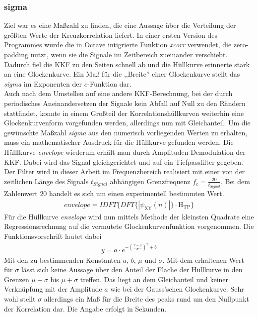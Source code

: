 \subsubsection{sigma}
Ziel war es eine Maßzahl zu finden, die eine Aussage über die Verteilung der größten Werte der Kreuzkorrelation liefert. In einer ersten Version des Programmes wurde die in Octave intigrierte Funktion \textit{xcorr} verwendet, die zero-padding nutzt, wenn sie die Signale im Zeitbereich zueinander verschiebt. Dadurch fiel die KKF zu den Seiten schnell ab und die Hüllkurve erinnerte stark an eine Glockenkurve. Ein Maß für die ,,Breite'' einer Glockenkurve stellt das \textit{sigma} im Exponenten der $e$-Funktion dar. 
\\Auch nach dem Umstellen auf eine andere KKF-Berechnung, bei der durch periodisches Aneinandersetzen der Signale kein Abfall auf Null zu den Rändern stattfindet, konnte in einem Großteil der Korrelationshüllkurven weiterhin eine Glockenkurvenform vorgefunden werden, allerdings nun mit Gleichanteil. Um die gewünschte Maßzahl \textit{sigma} aus den numerisch vorliegenden Werten zu erhalten, muss ein mathematischer Ausdruck für die Hüllkurve gefunden werden. Die Hülllkurve \textit{envelope} wiederum erhält man durch Amplituden-Demodulation der KKF. Dabei wird das Signal gleichgerichtet und auf ein Tiefpassfilter gegeben. Der Filter wird in dieser Arbeit im Frequenzbereich realisiert mit einer von der zeitlichen Länge des Signals $t_{Signal}$ abhängigen Grenzfrequenz $f_{c} = \frac{20}{t_{Signal}}$. Bei dem Zahlenwert $20$ handelt es sich um einen experimentell bestimmten Wert. 
\begin{align*}
envelope = IDFT\lbrace DFT\lbrace|\psi_{\text{XY}}(n)|\rbrace\cdot\text{H}_{\text{TP}}\rbrace
\end{align*}
Für die Hüllkurve \textit{envelope} wird nun mittels Methode der kleinsten Quadrate eine Regressionsrechnung auf die vermutete Glockenkurvenfunktion vorgenommen. Die Funktionsvorschrift lautet dabei
\begin{align*}
y = a\cdot e^{-(\frac{x-\mu}{\sigma})^2+b}
\end{align*}
Mit den zu bestimmenden Konstanten $a$, $b$, $\mu$ und $\sigma$. Mit dem erhaltenen Wert für $\sigma$ lässt sich keine Aussage über den Anteil der Fläche der Hüllkurve in den Grenzen $\mu-\sigma$ bis $\mu+\sigma$ treffen. Das liegt an dem Gleichanteil und keiner Verknüpfung mit der Amplitude $a$ wie bei der Gauss'schen Glockenkurve. Sehr wohl stellt $\sigma$ allerdings ein Maß für die Breite des peaks rund um den Nullpunkt der Korrelation dar. Die Angabe erfolgt in Sekunden. 
